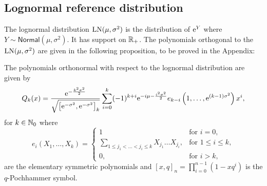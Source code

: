 

\subsection{Lognormal reference distribution}\label{SS:LogNNu}
The lognormal distribution $\mathrm{LN}(\mu, \sigma^2)$ is the distribution of $\mathrm{e}^Y$ where $Y \sim \mathsf{Normal}(\mu, \sigma^2)$. It has support on $\mathbb{R}_+$. The polynomials orthogonal to the $\mathrm{LN}(\mu, \sigma^2)$ are given in the following proposition, to be proved in the Appendix:

\begin{theorem}\label{LogNormalOrthogonalPolynomialProposition}
The polynomials orthonormal with respect to the lognormal distribution are given by
\begin{equation}\label{eq:OrthonormalPolynomialLogNormalExpression}
Q_{k}(x)=\frac{\mathrm{e}^{-\frac{k^{2}\sigma^{2}}{2}}}{\sqrt{\left[\mathrm{e}^{-\sigma^{2}},\mathrm{e}^{-\sigma^{2}}\right]_{k}}}\sum_{i=0}^{k}(-1)^{k+i}\mathrm{e}^{-i\mu-\frac{i^{2}\sigma^{2}}{2}}e_{k-i}\left(1,\ldots,\mathrm{e}^{(k-1)\sigma^{2}}\right)x^{i},
\end{equation}
for $k\in\mathbb{N}_0$ where
\begin{equation}\label{eq:ElementarySymmetricPolynomial}
e_{i}\left(X_{1},\ldots,X_{k}\right)=
\begin{cases}
1 &\mbox{for } i = 0, \\
\sum_{1\leq j_{1}<\ldots<j_{i}\leq k}X_{j_{1}}\ldots X_{j_{i}}, &\mbox{for } 1 \leq i\leq k, \\
0,& \mbox{for } i>k,
\end{cases}
\end{equation}
are the elementary symmetric polynomials and $\left[x,q\right]_{n}=\prod_{i=0}^{n-1}\left(1-xq^{i}\right)$ is the $q$-Pochhammer symbol.
\end{theorem}

